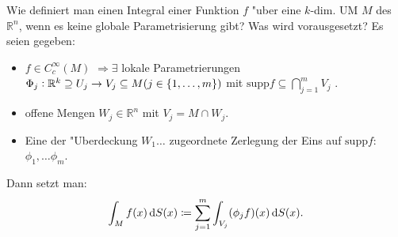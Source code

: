 \documentclass[9pt]{article}
\newenvironment{field}{}{\newpage}
\newif\ifnote
\newenvironment{note}{\notetrue}{\notefalse}
\newcommand{\localtag}{}
\newcommand{\globaltag}{}
\newcommand{\uuid}{}
\newcommand{\tags}[1]{
    \ifnote 
        \renewcommand{\localtag}{#1}
    \else
        \renewcommand{\globaltag}{#1}
    \fi 
    }
\newcommand{\xplain}[1]{\renewcommand{\uuid}{#1}}
\begin{document}
\begin{note}
	\xplain{df4c7e7c-51ba-4722-81b8-95fbc5596d7b}
	\tags{definition, 1.3.10}
	\begin{field}
		Wie definiert man einen Integral einer  Funktion $f$ "uber eine $k$-dim. UM $M$ des $\mathbb{R}^n$, wenn es keine globale Parametrisierung gibt? Was wird vorausgesetzt?
	\end{field}
		\begin{field}
			Es seien gegeben:
			\begin{itemize}
				\item $f \in C_c^\infty (M)$ $\Rightarrow \exists$
				lokale Parametrierungen $\Phi_j : \mathbb{R}^k \supseteq U_j \rightarrow V_j \subseteq M (j \in \qty{1, \dots, m})$ mit $\text{supp}f\subseteq \bigcap^m_{j=1}V_j$ . 
				
				\item offene Mengen $W_j\in \mathbb{R}^n$ mit $V_j = M \cap W_j$.
				
				\item Eine der "Uberdeckung $W_1 \dots$ zugeordnete Zerlegung der Eins auf $\text{supp}f$:
				$\phi_1, \dots \phi_m$.
			\end{itemize}
		Dann setzt man:
		\begin{equation*}
		\int_M f(x) \dif S(x) \coloneqq \sum_{j=1}^m \int_{V_j} (\phi_j f)(x) \dif S(x).
		\end{equation*}
		\end{field}
\end{note}
\end{document}
